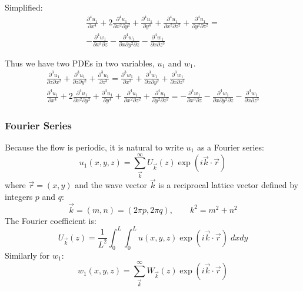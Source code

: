 \documentclass[a4paper]{report}
\begin{document}
Simplified:
\begin{multline}
\frac{\partial^4 u_1}{\partial x^4} 
+ 2 \frac{\partial^4 u_1}{\partial x^2 \partial y^2} 
+ \frac{\partial^4 u_1}{\partial y^4}
+ \frac{\partial^4 u_1}{\partial x^2 \partial z^2} 
+ \frac{\partial^4 u_1}{\partial y^2 \partial z^2}
=  \\
- \frac{\partial^4 w_1}{\partial x^3 \partial z} 
- \frac{\partial^4 w_1}{\partial x \partial y^2 \partial z} 
- \frac{\partial^4 w_1}{\partial x \partial z^3} 
\end{multline}

Thus we have two PDEs in two variables, $u_1$ and $w_1$.
\begin{gather}
\frac{\partial^3 u_1}{\partial z \partial x^2} + \frac{\partial^3 u_1}{\partial z \partial y^2}
+ \frac{\partial^3 u_1}{\partial z^3} =
\frac{\partial^3 w_1}{\partial x^3} + \frac{\partial^3 w_1}{\partial x \partial y^2}
+ \frac{\partial^3 w_1}{\partial x \partial z^2} 
\\
\frac{\partial^4 u_1}{\partial x^4} 
+ 2 \frac{\partial^4 u_1}{\partial x^2 \partial y^2} 
+ \frac{\partial^4 u_1}{\partial y^4}
+ \frac{\partial^4 u_1}{\partial x^2 \partial z^2} 
+ \frac{\partial^4 u_1}{\partial y^2 \partial z^2}
=
- \frac{\partial^4 w_1}{\partial x^3 \partial z} 
- \frac{\partial^4 w_1}{\partial x \partial y^2 \partial z} 
- \frac{\partial^4 w_1}{\partial x \partial z^3} 
\end{gather}


\subsubsection*{Fourier Series}

Because the flow is periodic, it is natural to write $u_1$ as a Fourier series:
\begin{equation}
u_1(x,y,z) = \sum_{\vec{k}}^{\infty} U_{\vec{k}}(z) \exp(i \vec{k}\cdot \vec{r})
\end{equation}
where $\vec{r} = (x,y)$ and the wave vector $\vec{k}$ is a reciprocal lattice vector defined by integers $p$ and $q$:
\begin{equation}
\vec{k} = (m,n) = (2\pi p, 2\pi q), \qquad k^2 = m^2 + n^2
\end{equation}
The Fourier coefficient is:
\begin{equation}
U_{\vec{k}}(z) = \frac{1}{L^2} \int_0^L \int_0^L u(x,y,z) \exp(i \vec{k} \cdot \vec{r})
\;dxdy
\end{equation}
Similarly for $w_1$:
\begin{equation}
w_1(x,y,z) = \sum_{\vec{k}}^{\infty} W_{\vec{k}}(z) \exp(i \vec{k}\cdot \vec{r})
\end{equation}
\end{document}
